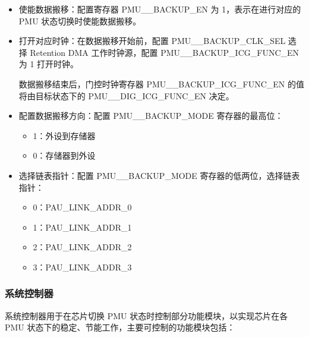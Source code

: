 \documentclass[main\_\_CN.tex]{subfiles}
\begin{document}
\begin{itemize}
    \item 使能数据搬移：配置寄存器 PMU\_\_BACKUP\_EN 为 1，表示在进行对应的 PMU 状态切换时使能数据搬移。
    \item 打开对应时钟：在数据搬移开始前，配置 PMU\_\_BACKUP\_CLK\_SEL 选择 Retention DMA 工作时钟源，配置 PMU\_\_BACKUP\_ICG\_FUNC\_EN 为 1 打开时钟。

    数据搬移结束后，门控时钟寄存器 PMU\_\_BACKUP\_ICG\_FUNC\_EN 的值将由目标状态下的 PMU\_\_DIG\_ICG\_FUNC\_EN 决定。

    \item 配置数据搬移方向：配置 PMU\_\_BACKUP\_MODE 寄存器的最高位：
        \begin{itemize}
            \item 1：外设到存储器
            \item 0：存储器到外设
        \end{itemize}

    \item 选择链表指针：配置 PMU\_\_BACKUP\_MODE 寄存器的低两位，选择链表指针：
        \begin{itemize}
        \item 0：PAU\_LINK\_ADDR\_0
        \item 1：PAU\_LINK\_ADDR\_1
        \item 2：PAU\_LINK\_ADDR\_2
        \item 3：PAU\_LINK\_ADDR\_3
        \end{itemize}
\end{itemize}

\subsubsection{系统控制器}

系统控制器用于在芯片切换 PMU 状态时控制部分功能模块，以实现芯片在各 PMU 状态下的稳定、节能工作，主要可控制的功能模块包括：
\end{document}

